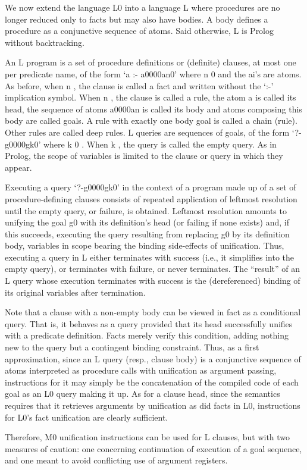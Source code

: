 \label{warren3}\secdown

We now extend the language L0 into a language L where procedures are no longer
reduced only to facts but may also have bodies. A body defines a procedure as a
conjunctive sequence of atoms. Said otherwise, L is Prolog without backtracking.

An L program is a set of procedure definitions or (definite) clauses, at most
one per predicate name, of the form ‘a :- a0000an0’ where n 0  and the ai’s are
atoms. As before, when n  , the clause is called a fact and written without
the ‘:-’ implication symbol. When n  , the clause is called a rule, the atom a
is called its head, the sequence of atoms a0000an is called its body and atoms
composing this body are called goals. A rule with exactly one body goal is
called a chain (rule). Other rules are called deep rules. L queries are
sequences of goals, of the form ‘?-g0000gk0’ where k 0 . When k  , the query
is called the empty query. As in Prolog, the scope of variables is limited to
the clause or query in which they appear.

Executing a query ‘?-g0000gk0’ in the context of a program made up of a set of
procedure-defining clauses consists of repeated application of leftmost
resolution until the empty query, or failure, is obtained. Leftmost resolution
amounts to unifying the goal g0 with its definition’s head (or failing if none
exists) and, if this succeeds, executing the query resulting from replacing g0
by its definition body, variables in scope bearing the binding side-effects of
unification. Thus, executing a query in L either terminates with success (i.e.,
it simplifies into the empty query), or terminates with failure, or never
terminates. The “result” of an L query whose execution terminates with success
is the (dereferenced) binding of its original variables after termination.

Note that a clause with a non-empty body can be viewed in fact as a conditional
query. That is, it behaves as a query provided that its head successfully
unifies with a predicate definition. Facts merely verify this condition, adding
nothing new to the query but a contingent binding constraint. Thus, as a first
approximation, since an L query (resp., clause body) is a conjunctive sequence
of atoms interpreted as procedure calls with unification as argument passing,
instructions for it may simply be the concatenation of the compiled code of each
goal as an L0 query making it up. As for a clause head, since the semantics
requires that it retrieves arguments by unification as did facts in L0,
instructions for L0’s fact unification are clearly sufficient.

Therefore, M0 unification instructions can be used for L clauses, but with two
measures of caution: one concerning continuation of execution of a goal
sequence, and one meant to avoid conflicting use of argument registers.




\secup